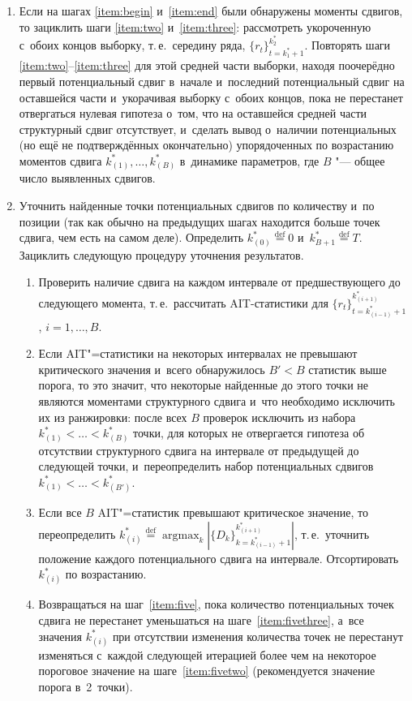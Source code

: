 \documentclass[11pt]{article}
\DeclareMathOperator*{\argmax}{argmax}
\newcommand{\eqdef}{\mathrel{\stackrel{\text{def}}=}} %
\begin{document}
\begin{enumerate}
\begin{enumerate}
	\end{enumerate}
	\item  Если на шагах \ref{item:begin} и~\ref{item:end} были обнаружены моменты сдвигов, то зациклить шаги \ref{item:two} и~\ref{item:three}: рассмотреть укороченную с~обоих концов выборку, т.\,е.\ середину ряда, $\{r_t\}_{t=k^*_1+1}^{k^*_2}$. Повторять шаги \ref{item:two}--\ref{item:three} для этой средней части выборки, находя поочерёдно первый потенциальный сдвиг в~начале и~последний потенциальный сдвиг на оставшейся части и~укорачивая выборку с~обоих концов, пока не перестанет отвергаться нулевая гипотеза о~том, что на оставшейся средней части структурный сдвиг отсутствует, и~сделать вывод о~наличии потенциальных (но ещё не подтверждённых окончательно) упорядоченных по возрастанию моментов сдвига $k^*_{(1)}, \ldots, k^*_{(B)}$ в~динамике параметров, где $B$ "--- общее число выявленных сдвигов.
	\item\label{item:rectify} Уточнить найденные точки потенциальных сдвигов по количеству и~по позиции (так как обычно на предыдущих шагах находится больше точек сдвига, чем есть на самом деле). Определить $k^*_{(0)} \eqdef 0$ и~$k^*_{{B+1}} \eqdef T$. Зациклить следующую процедуру уточнения результатов.
	\begin{enumerate}
		\item\label{item:five} Проверить наличие сдвига на каждом интервале от предшествующего до следующего момента, т.\,е.\ рассчитать AIT-статистики для $\{r_t\}_{t=k^*_{(i-1)}+1}^{k^*_{(i+1)}}$, $i = 1, \ldots, B$.
		\item\label{item:fivethree} Если AIT"=статистики на некоторых интервалах не превышают критического значения и~всего обнаружилось $B' < B$ статистик выше порога, то это значит, что некоторые найденные до этого точки не являются моментами структурного сдвига и~что необходимо исключить их из ранжировки: после всех $B$ проверок исключить из набора $k^*_{(1)} < \ldots < k^*_{(B)}$ точки, для которых не отвергается гипотеза об отсутствии структурного сдвига на интервале от предыдущей до следующей точки, и~переопределить набор потенциальных сдвигов $k^*_{(1)} < \ldots < k^*_{(B')}$.
		\item\label{item:fivetwo} Если все $B$ AIT"=статистик превышают критическое значение, то переопределить $k^*_{(i)}\eqdef \argmax_k |\{D_k\}_{k=k^*_{(i-1)}+1}^{k^*_{(i+1)}}|$, т.\,е.\ уточнить положение каждого потенциального сдвига на интервале. Отсортировать $k^*_{(i)}$ по возрастанию.
		\item Возвращаться на шаг~\ref{item:five}, пока количество потенциальных точек сдвига не перестанет уменьшаться на шаге~\ref{item:fivethree}, а~все значения $k^*_{(i)}$ при отсутствии изменения количества точек не перестанут изменяться с~каждой следующей итерацией более чем на некоторое пороговое значение на шаге~\ref{item:fivetwo} (рекомендуется значение порога в~2~точки).
	\end{enumerate}
\end{enumerate}
\end{document}
